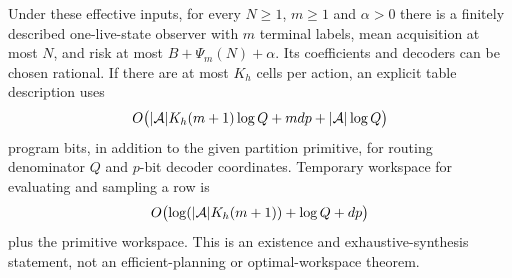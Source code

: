 \begin{proposition}\label{prop:finite}
Under these effective inputs, for every $N\ge1$, $m\ge1$ and $\alpha>0$ there is a finitely described one-live-state observer with $m$ terminal labels, mean acquisition at most $N$, and risk at most $B+\Psi_m(N)+\alpha$. Its coefficients and decoders can be chosen rational. If there are at most $K_h$ cells per action, an explicit table description uses
\begin{equation}\label{eq:program}
 O\bigl(|\mathcal A|K_h(m+1)\log Q+mdp+|\mathcal A|\log Q\bigr)
\end{equation}
program bits, in addition to the given partition primitive, for routing denominator $Q$ and $p$-bit decoder coordinates. Temporary workspace for evaluating and sampling a row is
\begin{equation}\label{eq:workspace}
 O\bigl(\log(|\mathcal A|K_h(m+1))+\log Q+dp\bigr)
\end{equation}
plus the primitive workspace. This is an existence and exhaustive-synthesis statement, not an efficient-planning or optimal-workspace theorem.
\end{proposition}
